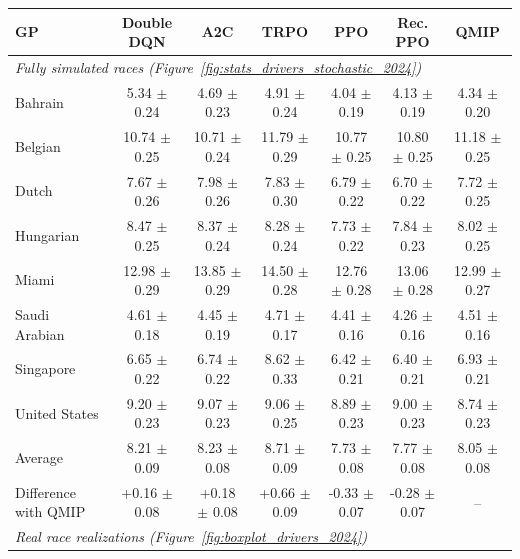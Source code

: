 \begin{tabular}{lcccccc}
\toprule
GP & Double DQN & A2C & TRPO & PPO & Rec. PPO & QMIP \\
\midrule
\multicolumn{7}{l}{\textit{Fully simulated races (Figure~\ref{fig:stats_drivers_stochastic_2024})}} \\
\midrule
Bahrain & 5.34 $\pm$ 0.24\vten{$^{\dagger}$} & 4.69 $\pm$ 0.23\vten{$^{\dagger}$} & 4.91 $\pm$ 0.24\vten{$^{\dagger}$} & 4.04 $\pm$ 0.19\vten{$^{*}$} & 4.13 $\pm$ 0.19\vten{$^{*}$} & 4.34 $\pm$ 0.20 \\
Belgian & 10.74 $\pm$ 0.25\vten{$^{*}$} & 10.71 $\pm$ 0.24\vten{$^{*}$} & 11.79 $\pm$ 0.29\vten{$^{\dagger}$} & 10.77 $\pm$ 0.25\vten{$^{*}$} & 10.80 $\pm$ 0.25\vten{$^{*}$} & 11.18 $\pm$ 0.25 \\
Dutch & 7.67 $\pm$ 0.26 & 7.98 $\pm$ 0.26\vten{$^{\dagger}$} & 7.83 $\pm$ 0.30 & 6.79 $\pm$ 0.22\vten{$^{*}$} & 6.70 $\pm$ 0.22\vten{$^{*}$} & 7.72 $\pm$ 0.25 \\
Hungarian & 8.47 $\pm$ 0.25\vten{$^{\dagger}$} & 8.37 $\pm$ 0.24\vten{$^{\dagger}$} & 8.28 $\pm$ 0.24\vten{$^{\dagger}$} & 7.73 $\pm$ 0.22\vten{$^{*}$} & 7.84 $\pm$ 0.23 & 8.02 $\pm$ 0.25 \\
Miami & 12.98 $\pm$ 0.29 & 13.85 $\pm$ 0.29\vten{$^{\dagger}$} & 14.50 $\pm$ 0.28\vten{$^{\dagger}$} & 12.76 $\pm$ 0.28\vten{$^{*}$} & 13.06 $\pm$ 0.28 & 12.99 $\pm$ 0.27 \\
Saudi Arabian & 4.61 $\pm$ 0.18 & 4.45 $\pm$ 0.19 & 4.71 $\pm$ 0.17\vten{$^{\dagger}$} & 4.41 $\pm$ 0.16 & 4.26 $\pm$ 0.16\vten{$^{*}$} & 4.51 $\pm$ 0.16 \\
Singapore & 6.65 $\pm$ 0.22\vten{$^{*}$} & 6.74 $\pm$ 0.22 & 8.62 $\pm$ 0.33\vten{$^{\dagger}$} & 6.42 $\pm$ 0.21\vten{$^{*}$} & 6.40 $\pm$ 0.21\vten{$^{*}$} & 6.93 $\pm$ 0.21 \\
United States & 9.20 $\pm$ 0.23\vten{$^{\dagger}$} & 9.07 $\pm$ 0.23\vten{$^{\dagger}$} & 9.06 $\pm$ 0.25\vten{$^{\dagger}$} & 8.89 $\pm$ 0.23 & 9.00 $\pm$ 0.23\vten{$^{\dagger}$} & 8.74 $\pm$ 0.23 \\
\midrule
Average & 8.21 $\pm$ 0.09\vten{$^{\dagger}$} & 8.23 $\pm$ 0.08\vten{$^{\dagger}$} & 8.71 $\pm$ 0.09\vten{$^{\dagger}$} & 7.73 $\pm$ 0.08\vten{$^{*}$} & 7.77 $\pm$ 0.08\vten{$^{*}$} & 8.05 $\pm$ 0.08 \\
Difference with QMIP & +0.16 $\pm$ 0.08 & +0.18 $\pm$ 0.08 & +0.66 $\pm$ 0.09 & -0.33 $\pm$ 0.07 & -0.28 $\pm$ 0.07 & -- \\
\midrule
\multicolumn{7}{l}{\textit{Real race realizations (Figure~\ref{fig:boxplot_drivers_2024})}} \\

\end{tabular}
